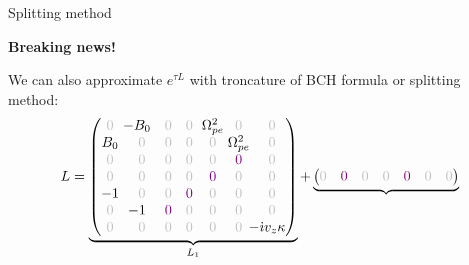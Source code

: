 \documentclass{beamer}
\newcommand{\mbold}[1]{{\textbf{\color{PLB}#1}}}
\newcommand{\I}{\dot{\imath}}
\begin{document}
\begin{frame}{Splitting method}
  \vspace{-2cm}\hfill\begin{turn}{-30}{\mbold{\textcolor{mred}{Breaking news!}}}\end{turn}

  We can also approximate $e^{\tau L}$ with troncature of BCH formula or splitting method:
  $$
    L = \underbrace{\begin{pmatrix}
      \gz & \hspace{-0.25cm}-B_0 & \gz                   & \gz                   & \hspace{-0.125cm}\Omega_{pe}^2\hspace{-0.125cm} &                  \gz                            & \gz \\ 
      B_0 &                  \gz & \gz                   & \gz                   &                  \gz                            & \hspace{-0.125cm}\Omega_{pe}^2\hspace{-0.125cm} & \gz \\
      \gz &                  \gz & \gz                   & \gz                   &                  \gz                            &                  \textcolor{violet}{0}          & \gz \\ 
      \gz &                  \gz & \gz                   & \gz                   &                  \textcolor{violet}{0}          &                  \gz                            & \gz \\ 
      -1  &                  \gz & \gz                   & \textcolor{violet}{0} &                  \gz                            &                  \gz                            & \gz \\ 
      \gz & \hspace{-0.25cm}-1   & \textcolor{violet}{0} & \gz                   &                  \gz                            &                  \gz                            & \gz \\ 
      \gz &                  \gz & \gz                   & \gz                   &                  \gz                            &                  \gz                            & \hspace{-0.25cm}-\I v_z\kappa \\ 
    \end{pmatrix}}_{L_1}
    +
    \underbrace{\begin{pmatrix}
      \gz & \textcolor{violet}{0} & \gz                      &  \gz                      &  \textcolor{violet}{0}            & \gz                      & \gz \\ 

\end{pmatrix}}$$
\end{frame}
\end{document}
